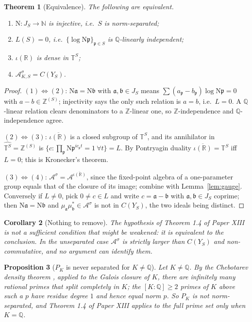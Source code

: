 \documentclass[11pt]{amsart}
\numberwithin{equation}{section}
\newtheorem{theorem}{Theorem}[section]
\newtheorem{proposition}[theorem]{Proposition}
\newtheorem{corollary}[theorem]{Corollary}
\theoremstyle{definition}
\theoremstyle{remark}
\newcommand{\Z}{\mathbb{Z}}
\newcommand{\Q}{\mathbb{Q}}
\newcommand{\R}{\mathbb{R}}
\newcommand{\N}{\mathbb{N}}
\newcommand{\T}{\mathbb{T}}
\newcommand{\cA}{\mathcal{A}}
\newcommand{\pp}{\mathfrak{p}}
\newcommand{\aaa}{\mathfrak{a}}
\newcommand{\bb}{\mathfrak{b}}
\newcommand{\Ns}{\mathrm{N}}
\begin{document}
\begin{theorem}[Equivalence]\label{thm:equiv}
The following are equivalent.
\begin{enumerate}
\item $\Ns:J_S\to\N$ is injective, i.e.\ $S$ is norm-separated;
\item $L(S)=0$, i.e.\ $\{\log\Ns\pp\}_{\pp\in S}$ is $\Q$-linearly independent;
\item $\iota(\R)$ is dense in $\T^S$;
\item $\cA_{K,S}^\sigma=C(Y_S)$.
\end{enumerate}
\end{theorem}

\begin{proof}
$(1)\Leftrightarrow(2)$: $\Ns\aaa=\Ns\bb$ with $\aaa,\bb\in J_S$ means
$\sum(a_\pp-b_\pp)\log\Ns\pp=0$ with $a-b\in\Z^{(S)}$; injectivity says the only such
relation is $a=b$, i.e.\ $L=0$. A $\Q$-linear relation clears denominators to a $\Z$-linear
one, so $\Z$-independence and $\Q$-independence agree.

$(2)\Leftrightarrow(3)$: $\overline{\iota(\R)}$ is a closed subgroup of $\T^S$, and its
annihilator in $\widehat{\T^S}=\Z^{(S)}$ is $\{c:\prod_\pp\Ns\pp^{ic_\pp t}=1\ \forall t\}=L$.
By Pontryagin duality $\overline{\iota(\R)}=\T^S$ iff $L=0$; this is Kronecker's theorem.

$(3)\Leftrightarrow(4)$: $\cA^\sigma=\cA^{\overline{\iota(\R)}}$, since the fixed-point
algebra of a one-parameter group equals that of the closure of its image; combine with
Lemma~\ref{lem:gauge}. Conversely if $L\ne0$, pick $0\ne c\in L$ and write $c=\aaa-\bb$ with
$\aaa,\bb\in J_S$ coprime; then $\Ns\aaa=\Ns\bb$ and $\mu_\aaa\mu_\bb^*\in\cA^\sigma$ is not
in $C(Y_S)$, the two ideals being distinct.
\end{proof}

\begin{corollary}[Nothing to remove]\label{cor:nothing}
The hypothesis of Theorem 1.4 of Paper XIII is not a sufficient condition that might be
weakened: it is equivalent to the conclusion. In the unseparated case $\cA^\sigma$ is strictly
larger than $C(Y_S)$ and non-commutative, and no argument can identify them.
\end{corollary}

\begin{proposition}[$P_K$ is never separated for $K\ne\Q$]\label{prop:PK}
Let $K\ne\Q$. By the Chebotarev density theorem \cite[Ch.~VII, \S13]{Neukirch}, applied to
the Galois closure of $K$, there are infinitely many rational primes that split completely
in $K$; the $[K:\Q]\ge2$ primes of $K$ above such a $p$ have residue degree $1$ and hence
equal norm $p$. So $P_K$ is not norm-separated, and Theorem 1.4 of Paper XIII applies to
the full prime set only when $K=\Q$.
\end{proposition}
\end{document}
